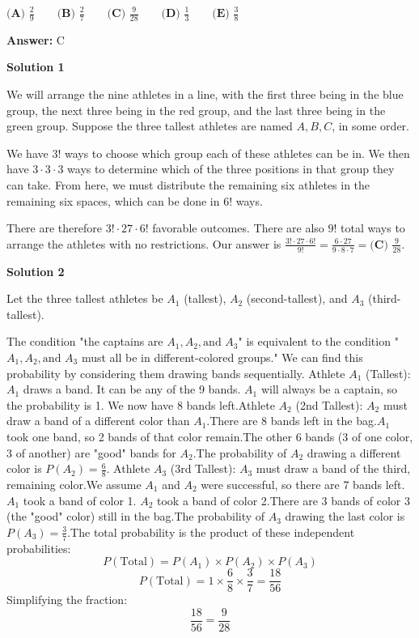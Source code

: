 \begin{enumerate}
 $\textbf{(A) } \frac29 \qquad \textbf{(B) } \frac 27 \qquad \textbf{(C) } \frac9{28}\qquad \textbf{(D) } \frac13 \qquad \textbf{(E) } \frac38$

 \textbf{Answer: }C



\textbf{Solution 1}

We will arrange the nine athletes in a line, with the first three being in the blue group, the next three being in the red group, and the last three being in the green group. Suppose the three tallest athletes are named $A, B, C$, in some order. 

 We have $3!$ ways to choose which group each of these athletes can be in. We then have $3 \cdot 3 \cdot 3$ ways to determine which of the three positions in that group they can take. From here, we must distribute the remaining six athletes in the remaining six spaces, which can be done in $6!$ ways.

 There are therefore $3! \cdot 27 \cdot 6!$ favorable outcomes. There are also $9!$ total ways to arrange the athletes with no restrictions. Our answer is $\frac{3! \cdot 27 \cdot 6!}{9!} = \frac{6 \cdot 27}{9 \cdot 8 \cdot 7} = \boxed{\textbf{(C) }\frac{9}{28}}.$




\textbf{Solution 2}

Let the three tallest athletes be $A_1$ (tallest), $A_2$ (second-tallest), and $A_3$ (third-tallest).

 The condition "the captains are $A_1, A_2, \text{and } A_3$" is equivalent to the condition "$A_1, A_2, \text{and } A_3$ must all be in different-colored groups." We can find this probability by considering them drawing bands sequentially. Athlete $A_1$ (Tallest): $A_1$ draws a band. It can be any of the 9 bands. $A_1$ will always be a captain, so the probability is 1. We now have 8 bands left.Athlete $A_2$ (2nd Tallest): $A_2$ must draw a band of a different color than $A_1$.There are 8 bands left in the bag.$A_1$ took one band, so 2 bands of that color remain.The other 6 bands (3 of one color, 3 of another) are "good" bands for $A_2$.The probability of $A_2$ drawing a different color is $P(A_2) = \frac{6}{8}$. Athlete $A_3$ (3rd Tallest): $A_3$ must draw a band of the third, remaining color.We assume $A_1$ and $A_2$ were successful, so there are 7 bands left.$A_1$ took a band of color 1. $A_2$ took a band of color 2.There are 3 bands of color 3 (the "good" color) still in the bag.The probability of $A_3$ drawing the last color is $P(A_3) = \frac{3}{7}$.The total probability is the product of these independent probabilities:
 \[P(\text{Total}) = P(A_1) \times P(A_2) \times P(A_3)\]
 \[P(\text{Total}) = 1 \times \frac{6}{8} \times \frac{3}{7} = \frac{18}{56}\]Simplifying the fraction:
 \[\frac{18}{56} = \frac{9}{28}\]


\end{enumerate}

